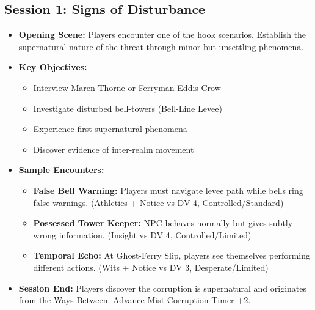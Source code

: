 \documentclass[11pt]{article}
\begin{document}
\subsection*{Session 1: Signs of Disturbance}
\begin{itemize}
    \item \textbf{Opening Scene:} Players encounter one of the hook scenarios. Establish the supernatural nature of the threat through minor but unsettling phenomena.
    \item \textbf{Key Objectives:}
    \begin{itemize}
        \item Interview Maren Thorne or Ferryman Eddis Crow
        \item Investigate disturbed bell-towers (Bell-Line Levee)
        \item Experience first supernatural phenomena
        \item Discover evidence of inter-realm movement
    \end{itemize}
    \item \textbf{Sample Encounters:}
    \begin{itemize}
        \item \textbf{False Bell Warning:} Players must navigate levee path while bells ring false warnings. (Athletics + Notice vs DV 4, Controlled/Standard)
        \item \textbf{Possessed Tower Keeper:} NPC behaves normally but gives subtly wrong information. (Insight vs DV 4, Controlled/Limited)
        \item \textbf{Temporal Echo:} At Ghost-Ferry Slip, players see themselves performing different actions. (Wits + Notice vs DV 3, Desperate/Limited)
    \end{itemize}
    \item \textbf{Session End:} Players discover the corruption is supernatural and originates from the Ways Between. Advance Mist Corruption Timer +2.
\end{itemize}
\end{document}
